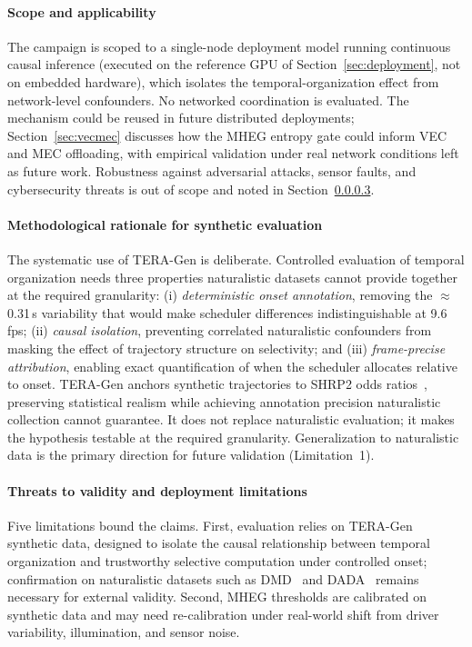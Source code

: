 \documentclass[a4paper,fleqn]{cas-dc}
\newcommand{\TERAGen}{\mbox{TERA-Gen}\xspace}
\newcommand{\MHEG}{\mbox{MHEG}\xspace}
\begin{document}
\paragraph{Scope and applicability}
\label{sec:scope}
The campaign is scoped to a single-node deployment model running continuous
causal inference {\color{\revcolor}(executed on the reference GPU of
Section~\ref{sec:deployment}, not on embedded hardware)}, which isolates the temporal-organization effect from network-level
confounders. No networked coordination is evaluated. The mechanism could be
reused in future distributed deployments; Section~\ref{sec:vecmec} discusses how
the \MHEG entropy gate could inform VEC and MEC offloading, with empirical
validation under real network conditions left as future work. Robustness against
adversarial attacks, sensor faults, and cybersecurity threats is out of scope
and noted in Section~\ref{sec:limitations}.
\paragraph{Methodological rationale for synthetic evaluation}
The systematic use of \TERAGen is deliberate. Controlled evaluation of temporal
organization needs three properties naturalistic datasets cannot provide
together at the required granularity: (i) \emph{deterministic onset annotation},
removing the $\approx$0.31\,s variability that would make scheduler differences
indistinguishable at 9.6\,fps; (ii) \emph{causal isolation}, preventing
correlated naturalistic confounders from masking the effect of trajectory
structure on selectivity; and (iii) \emph{frame-precise attribution}, enabling
exact quantification of when the scheduler allocates relative to onset. \TERAGen
anchors synthetic trajectories to SHRP2 odds ratios~\cite{dingus2016shrp2},
preserving statistical realism while achieving annotation precision naturalistic
collection cannot guarantee. It does not replace naturalistic evaluation; it
makes the hypothesis testable at the required granularity. Generalization to
naturalistic data is the primary direction for future validation (Limitation~1).
\paragraph{Threats to validity and deployment limitations}
\label{sec:limitations}
{\color{\revcolor}Five} limitations bound the claims. First, evaluation relies on \TERAGen
synthetic data, designed to isolate the causal relationship between temporal
organization and trustworthy selective computation under controlled onset;
confirmation on naturalistic datasets such as DMD~\cite{ortega2020dmd} and
DADA~\cite{fang2022dada} remains necessary for external validity. Second, \MHEG
thresholds are calibrated on synthetic data and may need re-calibration under
real-world shift from driver variability, illumination, and sensor noise.
\end{document}
